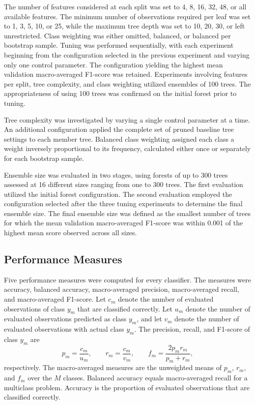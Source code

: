 \documentclass[conference]{IEEEtran}
\begin{document}
The number of features considered at each split was set to 4, 8, 16, 32, 48, or all available features. The minimum number of observations required per leaf was set to 1, 3, 5, 10, or 25, while the maximum tree depth was set to 10, 20, 30, or left unrestricted. Class weighting was either omitted, balanced, or balanced per bootstrap sample. Tuning was performed sequentially, with each experiment beginning from the configuration selected in the previous experiment and varying only one control parameter. The configuration yielding the highest mean validation macro-averaged F1-score was retained. Experiments involving features per split, tree complexity, and class weighting utilized ensembles of 100 trees. The appropriateness of using 100 trees was confirmed on the initial forest prior to tuning.

Tree complexity was investigated by varying a single control parameter at a time. An additional configuration applied the complete set of pruned baseline tree settings to each member tree. Balanced class weighting assigned each class a weight inversely proportional to its frequency, calculated either once or separately for each bootstrap sample.

Ensemble size was evaluated in two stages, using forests of up to 300 trees assessed at 16 different sizes ranging from one to 300 trees. The first evaluation utilized the initial forest configuration. The second evaluation employed the configuration selected after the three tuning experiments to determine the final ensemble size. The final ensemble size was defined as the smallest number of trees for which the mean validation macro-averaged F1-score was within 0.001 of the highest mean score observed across all sizes.

\subsection{Performance Measures}

Five performance measures were computed for every classifier. The measures were accuracy, balanced accuracy, macro-averaged precision, macro-averaged recall, and macro-averaged F1-score. Let $c_m$ denote the number of evaluated observations of class $y_m$ that are classified correctly. Let $u_m$ denote the number of evaluated observations predicted as class $y_m$, and let $v_m$ denote the number of evaluated observations with actual class $y_m$. The precision, recall, and F1-score of class $y_m$ are
\begin{equation}
p_m=\frac{c_m}{u_m},\qquad r_m=\frac{c_m}{v_m},\qquad f_m=\frac{2p_mr_m}{p_m+r_m},
\label{eq:measures}
\end{equation}
respectively. The macro-averaged measures are the unweighted means of $p_m$, $r_m$, and $f_m$ over the $M$ classes. Balanced accuracy equals macro-averaged recall for a multiclass problem. Accuracy is the proportion of evaluated observations that are classified correctly.
\end{document}
